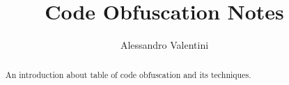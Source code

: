 \documentclass[oneside, a4paper, titlepage, openright]{report}
\title{Code Obfuscation Notes}
\author{Alessandro Valentini}
\begin{document}
\maketitle

\begin{abstract}
	An introduction about table of code obfuscation and its techniques.
\end{abstract}

\tableofcontents














	


\end{document}
